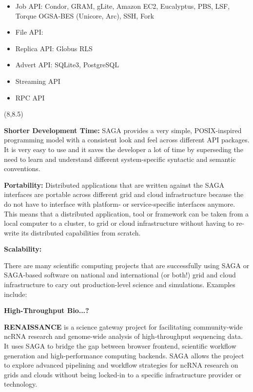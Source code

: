 \documentclass[a0b,portrait]{a0poster}
\def\LHead#1{\bigskip\bigskip\noindent{\huge\color{HeadColor} #1}\smallskip}
\begin{document}
\begin{textblock}{7}
\begin{itemize} 
\item{Job API: Condor, GRAM, gLite, Amazon EC2, Eucalyptus, PBS, LSF, Torque
OGSA-BES (Unicore, Arc), SSH, Fork}
\item{File API:} 
\item{Replica API: Globus RLS}
\item{Advert API: SQLite3, PostgreSQL} 
\item{Streaming API} 
\item{RPC API} 
\end{itemize}

\end{textblock}

\begin{textblock}{7}(8,8.5)

\LHead{Why Use SAGA ?}

\textbf{\color{DarkBlue} Shorter Development Time:} SAGA provides a very
simple, POSIX-inspired programming model with a consistent look and feel
across different API packages. It is very easy to use and
it saves the developer a lot of time by superseding the need to learn and
understand different system-specific syntactic and semantic conventions.

\textbf{\color{DarkBlue} Portability:} Distributed applications that are
written against the SAGA interfaces are portable across different grid and
cloud infrastructure because the do not have to interface with platform- or
service-specific interfaces anymore. This means that a distributed
application, tool or framework can be taken from a local computer to a
cluster, to grid or cloud infrastructure without having to re-write its
distributed capabilities from scratch. 

\textbf{\color{DarkBlue} Scalability:}

\large


\LHead{How SAGA is Used}
\large

There are many scientific computing projects that are successfully using SAGA
or SAGA-based software on national and international (or both!) grid and cloud
infrastructure to cary out production-level science and simulations. Examples 
include:

\textbf{\color{DarkBlue} High-Throughput Bio...?}

\textbf{\color{DarkBlue} RENAISSANCE} is a science gateway
project for facilitating community-wide ncRNA research and genome-wide
analysis of high-throughput sequencing data. It uses SAGA to bridge the gap
between browser frontend, scientific workflow generation and high-performance
computing backends. SAGA allows the project to explore advanced pipelining and
workflow strategies for ncRNA research on grids and clouds without being
locked-in to a specific infrastructure provider or technology. 


\end{textblock}
\end{document}
